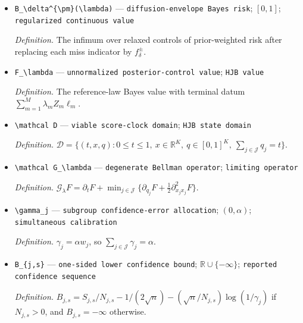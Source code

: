 \documentclass{article}
\begin{document}
\begin{itemize}
  \par\smallskip\noindent\emph{Definition.} The infimum over finite policies of prior-weighted risk after replacing each miss indicator by \(f_\delta^{\pm}\).
  \item \texttt{B\_\allowbreak{}\textbackslash{}\allowbreak{}delta\textasciicircum{}\{\textbackslash{}\allowbreak{}pm\}\allowbreak{}(\textbackslash{}\allowbreak{}lambda)} --- \texttt{diffusion-\allowbreak{}envelope Bayes risk}; \([0,1]\); \texttt{regularized continuous value}
  \par\smallskip\noindent\emph{Definition.} The infimum over relaxed controls of prior-weighted risk after replacing each miss indicator by \(f_\delta^{\pm}\).
  \item \texttt{F\_\allowbreak{}\textbackslash{}\allowbreak{}lambda} --- \texttt{unnormalized posterior-\allowbreak{}control value}; \texttt{HJB value}
  \par\smallskip\noindent\emph{Definition.} The reference-law Bayes value with terminal datum \(\sum_{m=1}^M\lambda_mZ_m\ell_m\).
  \item \texttt{\textbackslash{}\allowbreak{}mathcal D} --- \texttt{viable score-\allowbreak{}clock domain}; \texttt{HJB state domain}
  \par\smallskip\noindent\emph{Definition.} \(\mathcal D=\{(t,x,q):0\leq t\leq1,\ x\in\mathbb R^K,\ q\in[0,1]^K,\ \sum_{j\in\mathcal J}q_j=t\}\).
  \item \texttt{\textbackslash{}\allowbreak{}mathcal G\_\allowbreak{}\textbackslash{}\allowbreak{}lambda} --- \texttt{degenerate Bellman operator}; \texttt{limiting operator}
  \par\smallskip\noindent\emph{Definition.} \(\mathcal G_\lambda F=\partial_tF+\min_{j\in\mathcal J}\{\partial_{q_j}F+\tfrac12\partial_{x_jx_j}^2F\}\).
  \item \texttt{\textbackslash{}\allowbreak{}gamma\_\allowbreak{}j} --- \texttt{subgroup confidence-\allowbreak{}error allocation}; \((0,\alpha)\); \texttt{simultaneous calibration}
  \par\smallskip\noindent\emph{Definition.} \(\gamma_j=\alpha w_j\), so \(\sum_{j\in\mathcal J}\gamma_j=\alpha\).
  \item \texttt{B\_\allowbreak{}\{j,\allowbreak{}s\}\allowbreak{}} --- \texttt{one-\allowbreak{}sided lower confidence bound}; \(\mathbb R\cup\{-\infty\}\); \texttt{reported confidence sequence}
  \par\smallskip\noindent\emph{Definition.} \(B_{j,s}=S_{j,s}/N_{j,s}-1/(2\sqrt n)-(\sqrt n/N_{j,s})\log(1/\gamma_j)\) if \(N_{j,s}>0\), and \(B_{j,s}=-\infty\) otherwise.

\end{itemize}
\end{document}
